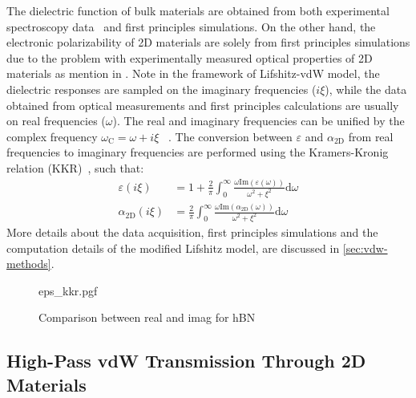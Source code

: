 The dielectric function of bulk materials are obtained from both
experimental spectroscopy data~\cite{Palik_1998_handbook} and first
principles simulations.
%
On the other hand, the electronic polarizability of 2D
materials are solely from first principles simulations due to the
problem with experimentally measured optical properties of 2D
materials as mention in .
%
Note in the framework of Lifshitz-vdW model, the dielectric responses
are sampled on the imaginary frequencies ($i\xi$), while the data
obtained from optical measurements and first principles calculations
are usually on real frequencies ($\omega$). The real and imaginary
frequencies can be unified by the complex frequency
$\omega_{\mathrm{C}} = \omega + i\xi$~\cite{parsegian_van_2010_book}
.
%
The conversion between $\varepsilon$ and $\alpha_{\mathrm{2D}}$ from
real frequencies to imaginary frequencies are performed using the
Kramers-Kronig relation (KKR)~\cite{Roessler_1965_KKR}, such that:
\begin{eqnarray}
  \label{eq:vdw-KKR-eps}
  \varepsilon(i\xi) &= 1 + {\displaystyle \frac{2}{\pi}}{\displaystyle \int_{0}^{\infty}} {\displaystyle \frac{\omega \mathrm{Im}(\varepsilon(\omega))}{\omega^{2} + \xi^{2}}} \mathrm{d}\omega \\
  \label{eq:vdw-KKR-alpha}
  \alpha_{\mathrm{2D}}(i\xi) &= {\displaystyle \frac{2}{\pi}} {\displaystyle \int_{0}^{\infty}} {\displaystyle \frac{\omega \mathrm{Im}(\alpha_{\mathrm{2D}}(\omega))}{\omega^{2} + \xi^{2}}} \mathrm{d}\omega
\end{eqnarray}
%
More details about the data acquisition, first principles simulations
and the computation details of the modified Lifshitz model, are
discussed in \autoref{sec:vdw-methods}.   

\begin{figure}[h]
  \centering{}
  {eps_kkr.pgf}
  \caption{\label{fig:vdw-compare-eps-kkr} %
    Comparison between real and imag for hBN 
  }
\end{figure}


\subsection{High-Pass vdW Transmission Through 2D Materials}
\label{sec:vdw-high-pass-vdw}


